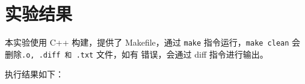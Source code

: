\section{实验结果}

本实验使用 C++ 构建，提供了 Makefile，通过 \verb|make| 指令运行，\verb|make clean| 会删除\verb|.o, .diff 和 .txt| 文件，如有 错误，会通过 diff 指令进行输出。

执行结果如下：

